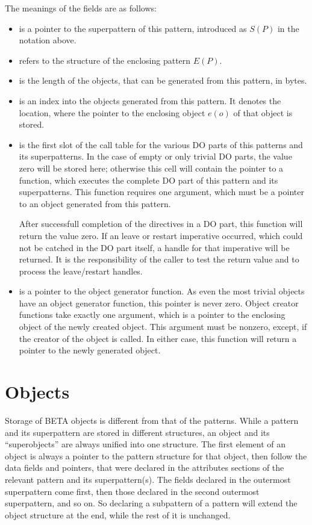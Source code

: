 The meanings of the fields are as follows:
\begin{itemize}
\item {} is a pointer to the superpattern of this pattern,
    introduced as $S(P)$ in the notation above.
\item {} refers to the structure of the enclosing pattern $E(P)$.
\item {} is the length of the objects, that can be generated
    from this pattern, in bytes.
\item {} is an index into the objects generated from
    this pattern.  It denotes the location, where the pointer to
    the enclosing object $e(o)$ of that object is stored.
\item {} is the first slot of the call table for the
    various DO parts of this patterns and its superpatterns.  In
    the case of empty or only trivial DO parts, the value zero
    will be stored here; otherwise this cell will contain the
    pointer to a function, which executes the complete DO part
    of this pattern and its superpatterns.  This function requires
    one argument, which must be a pointer to an object generated
    from this pattern.

    After successfull completion of the directives in a DO part,
    this function will return the value zero.  If an leave or
    restart imperative occurred, which could not be catched in
    the DO part itself, a handle for that imperative will be
    returned.  It is the responsibility of the caller to test
    the return value and to process the leave/restart handles.
\item {} is a pointer to the object generator function.
    As even the most trivial objects have an object generator
    function, this pointer is never zero.  Object creator
    functions take exactly one argument, which is a pointer
    to the enclosing object of the newly created object.
    This argument must be nonzero, except, if the creator of
    the  object is called.  In either case, this
    function will return a pointer to the newly generated
    object.
\end{itemize}

\section{Objects}
Storage of BETA objects is different from that of the patterns.
While a pattern and its superpattern are stored in different
structures, an object and its ``superobjects'' are always unified
into one structure.  The first element of an object is always a
pointer to the pattern structure for that object, then follow the
data fields and pointers, that were declared in the attributes
sections of the relevant pattern and its superpattern(s).  The
fields declared in the outermost superpattern come first, then
those declared in the second outermost superpattern, and so on.
So declaring a subpattern of a pattern will extend the object
structure at the end, while the rest of it is unchanged.

